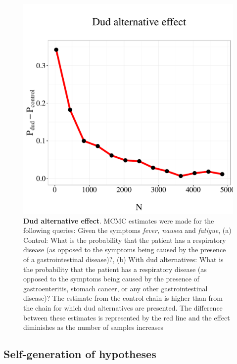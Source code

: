 \begin{figure}
\centering
\includegraphics[scale = 0.5]{figures/dud.pdf}
\caption{\textbf{Dud alternative effect}. MCMC estimates were made for the following queries: Given the symptoms \emph{fever, nausea}  and \emph{fatigue}, (a) Control: What is the probability that the patient has a respiratory disease (as opposed to the symptoms being caused by the presence of a gastrointestinal disease)?,  (b) With dud alternatives: What is the probability that the patient has a respiratory disease (as opposed to the symptoms being caused by the presence of gastroenteritis, stomach cancer, or any other gastrointestinal disease)? The estimate from the control chain is higher than from the chain for which dud alternatives are presented. The difference between these estimates is represented by the red line and the effect diminishes as the number of samples increases}
\label{fig:dud}
\end{figure}

\subsection{Self-generation of hypotheses}

